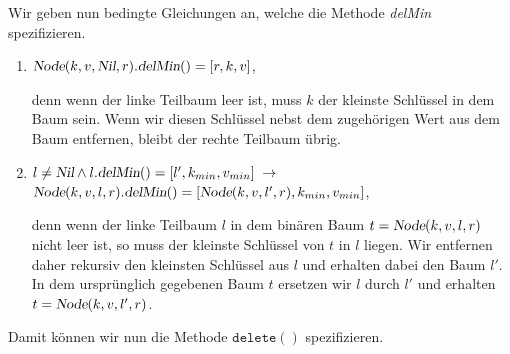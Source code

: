 Wir geben nun bedingte Gleichungen an, welche die Methode \textsl{delMin} spezifizieren.
\begin{enumerate}
\item $\textsl{Node}(k, v, \textsl{Nil}, r).\textsl{delMin}() = [r, k, v]$,

      denn wenn der linke Teilbaum leer ist, muss $k$ der kleinste Schl\"ussel in 
      dem Baum sein.  Wenn wir diesen  Schl\"ussel nebst dem zugeh\"origen Wert aus dem Baum
      entfernen, bleibt der rechte Teilbaum \"ubrig.
\item $l\not= \textsl{Nil} \wedge l.\textsl{delMin}() = [l',k_{min}, v_{min}] \;\rightarrow$ \\[0.1cm]
       \hspace*{1.3cm} 
       $\textsl{Node}(k, v, l, r).\textsl{delMin}() = [\textsl{Node}(k, v, l', r), k_{min}, v_{min}]$,

      denn wenn der linke Teilbaum $l$ in dem bin\"aren Baum $t = \textsl{Node}(k, v, l, r)$
      nicht leer ist, so muss der kleinste Schl\"ussel von $t$ in $l$ liegen.
      Wir entfernen daher rekursiv den kleinsten Schl\"ussel aus $l$ und erhalten dabei den
      Baum $l'$.  In dem urspr\"unglich gegebenen Baum $t$ ersetzen wir $l$ durch $l'$ und erhalten
      $t = \textsl{Node}(k, v, l', r)$.
\end{enumerate}
Damit k\"onnen wir nun die Methode $\mathtt{delete}()$ spezifizieren.
